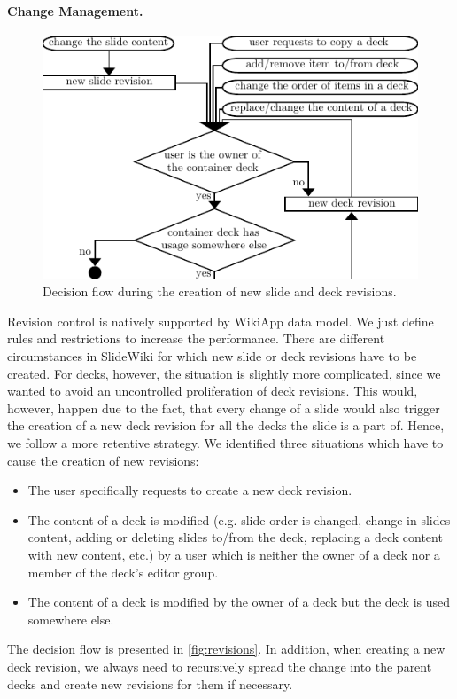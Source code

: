 \documentclass[ngerman,UKenglish,table]{scrbook}
\begin{document}
\paragraph{Change Management.}
\label{par:change_management}
\begin{figure}[htb]
	\centering
		\includegraphics[width=.8\columnwidth]{images/revisions.pdf}
	\caption{Decision flow during the creation of new slide and deck revisions.}
	\label{fig:revisions}
\end{figure}

Revision control is natively supported by WikiApp data model.
We just define rules and restrictions to increase the performance.
There are different circumstances in SlideWiki for which new slide or deck revisions have to be created.
For decks, however, the situation is slightly more complicated, since we wanted to avoid an uncontrolled proliferation of deck revisions.
This would, however, happen due to the fact, that every change of a slide would also trigger the creation of a new deck revision for all the decks the slide is a part of.
Hence, we follow a more retentive strategy.
We identified three situations which have to cause the creation of new revisions:
\begin{itemize}
	\item The user specifically requests to create a new deck revision.
	\item The content of a deck is modified (e.g. slide order is changed, change in slides content, adding or deleting slides to/from the deck, replacing a deck content with new content, etc.) by a user which is neither the owner of a deck nor a member of the deck's editor group.
	\item The content of a deck is modified by the owner of a deck but the deck is used somewhere else.
\end{itemize}
The decision flow is presented in \autoref{fig:revisions}.
In addition, when creating a new deck revision, we always need to recursively spread the change into the parent decks and create new revisions for them if necessary.
\end{document}
